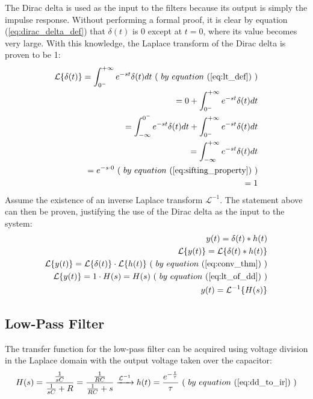 The Dirac delta is used as the input to the filters because its output is simply the impulse response. Without performing a formal proof, it is clear by equation (\ref{eq:dirac_delta_def}) that $\delta(t)$ is 0 except at $t = 0$, where its value becomes very large. With this knowledge, the Laplace transform of the Dirac delta is proven to be 1:
\begin{equation*}
	\label{eq:lt_of_dd}
	\begin{aligned}
		\mathcal{L}\{\delta(t)\} = \int_{0^{-}}^{+\infty} e^{-st}\delta(t)dt \ ( \ by \ equation \ (\ref{eq:lt_def}) \ ) \\
				       = 0 + \int_{0^{-}}^{+\infty} e^{-st}\delta(t)dt \\
				       = \int_{-\infty}^{0^{-}} e^{-st}\delta(t)dt + \int_{0^{-}}^{+\infty} e^{-st}\delta(t)dt \\
				       = \int_{-\infty}^{+\infty} e^{-st}\delta(t)dt \\
				       = e^{-s \cdot 0} \ ( \ by \ equation \ (\ref{eq:sifting_property}) \ ) \\
				       = 1
	\end{aligned}
\end{equation*}
Assume the existence of an inverse Laplace transform $\mathcal{L}^{-1}$. The statement above can then be proven, justifying the use of the Dirac delta as the input to the system:
\begin{equation*}
	\label{eq:dd_to_ir}
	\begin{aligned}
		y(t) = \delta(t) * h(t) \\
		\mathcal{L}\{y(t)\} = \mathcal{L}\{\delta(t) * h(t)\} \\
		\mathcal{L}\{y(t)\} = \mathcal{L}\{\delta(t)\} \cdot \mathcal{L}\{h(t)\} \ ( \ by \ equation \ (\ref{eq:conv_thm}) \ ) \\
		\mathcal{L}\{y(t)\} = 1 \cdot H(s) = H(s) \ ( \ by \ equation \ (\ref{eq:lt_of_dd}) \ ) \\
		y(t) = \mathcal{L}^{-1}\{H(s)\}
	\end{aligned}
\end{equation*}

\subsection{Low-Pass Filter}
The transfer function for the low-pass filter can be acquired using voltage division in the Laplace domain with the output voltage taken over the capacitor:
\begin{equation}
	\label{eq:tf_lpf}
	H(s) = \frac{ \frac{ 1 }{ sC } }{ \frac{ 1 }{ sC } + R } = \frac{ \frac{ 1 }{ RC } }{ \frac{ 1 }{ RC } + s } \xrightarrow{\mathcal{L}^{-1}} h(t) = \frac{ e^{-\frac{t}{\tau}} }{ \tau } \ ( \ by \ equation \ (\ref{eq:dd_to_ir}) \ )
\end{equation}

